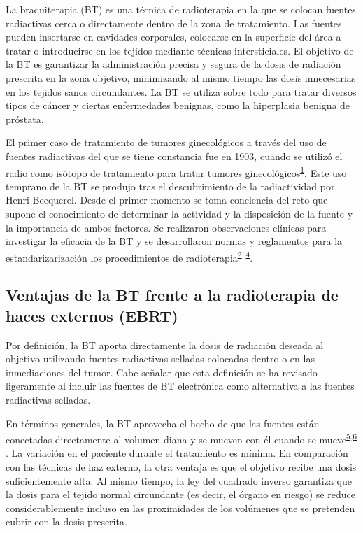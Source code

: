 \documentclass[
  a4paper,
]{scrreprt}
\begin{document}
La braquiterapia (BT) es una técnica de radioterapia en la que se
colocan fuentes radiactivas cerca o directamente dentro de la zona de
tratamiento. Las fuentes pueden insertarse en cavidades corporales,
colocarse en la superficie del área a tratar o introducirse en los
tejidos mediante técnicas intersticiales. El objetivo de la BT es
garantizar la administración precisa y segura de la dosis de radiación
prescrita en la zona objetivo, minimizando al mismo tiempo las dosis
innecesarias en los tejidos sanos circundantes. La BT se utiliza sobre
todo para tratar diversos tipos de cáncer y ciertas enfermedades
benignas, como la hiperplasia benigna de próstata.

El primer caso de tratamiento de tumores ginecológicos a través del uso
de fuentes radiactivas del que se tiene constancia fue en 1903, cuando
se utilizó el radio como isótopo de tratamiento para tratar tumores
ginecológicos\textsuperscript{\protect\hyperlink{ref-goodwin1968}{1}}.
Este uso temprano de la BT se produjo tras el descubrimiento de la
radiactividad por Henri Becquerel. Desde el primer momento se toma
conciencia del reto que supone el conocimiento de determinar la
actividad y la disposición de la fuente y la importancia de ambos
factores. Se realizaron observaciones clínicas para investigar la
eficacia de la BT y se desarrollaron normas y reglamentos para la
estandarizarización los procedimientos de
radioterapia\textsuperscript{\protect\hyperlink{ref-adosage1934}{2}--\protect\hyperlink{ref-thetrea1949b}{4}}.

\hypertarget{ventajas-de-la-bt-frente-a-la-radioterapia-de-haces-externos-ebrt}{%
\subsection{Ventajas de la BT frente a la radioterapia de haces externos
(EBRT)}\label{ventajas-de-la-bt-frente-a-la-radioterapia-de-haces-externos-ebrt}}

Por definición, la BT aporta directamente la dosis de radiación deseada
al objetivo utilizando fuentes radiactivas selladas colocadas dentro o
en las inmediaciones del tumor. Cabe señalar que esta definición se ha
revisado ligeramente al incluir las fuentes de BT electrónica como
alternativa a las fuentes radiactivas selladas.

En términos generales, la BT aprovecha el hecho de que las fuentes están
conectadas directamente al volumen diana y se mueven con él cuando se
mueve\textsuperscript{\protect\hyperlink{ref-viswanathan2012a}{5},\protect\hyperlink{ref-williamson2006}{6}}
. La variación en el paciente durante el tratamiento es mínima. En
comparación con las técnicas de haz externo, la otra ventaja es que el
objetivo recibe una dosis suficientemente alta. Al mismo tiempo, la ley
del cuadrado inverso garantiza que la dosis para el tejido normal
circundante (es decir, el órgano en riesgo) se reduce considerablemente
incluso en las proximidades de los volúmenes que se pretenden cubrir con
la dosis prescrita.
\end{document}
